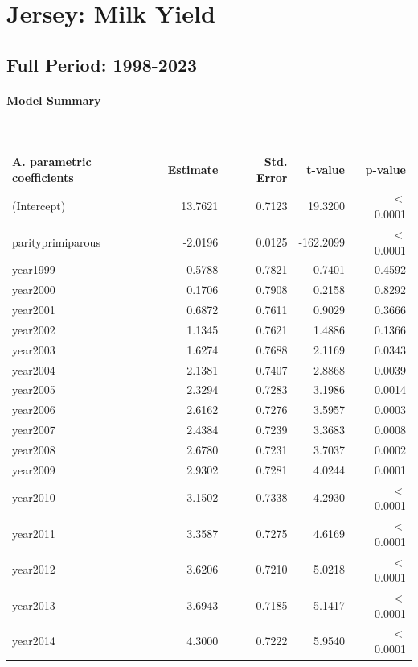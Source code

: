 \section{Jersey: Milk Yield}
\subsection{Full Period: 1998-2023}\label{model:je_milk_full}
\paragraph{Model Summary} \quad \\

    \begin{table}[H]
    \centering
    \begin{tabular}{lrrrr}
    \textbf{A. parametric coefficients} & Estimate & Std. Error & t-value & p-value \\ 
       \hline
       \hline
  (Intercept) & 13.7621 & 0.7123 & 19.3200 & $<$ 0.0001 \\ 
  parityprimiparous & -2.0196 & 0.0125 & -162.2099 & $<$ 0.0001 \\ 
  year1999 & -0.5788 & 0.7821 & -0.7401 & 0.4592 \\ 
  year2000 & 0.1706 & 0.7908 & 0.2158 & 0.8292 \\ 
  year2001 & 0.6872 & 0.7611 & 0.9029 & 0.3666 \\ 
  year2002 & 1.1345 & 0.7621 & 1.4886 & 0.1366 \\ 
  year2003 & 1.6274 & 0.7688 & 2.1169 & 0.0343 \\ 
  year2004 & 2.1381 & 0.7407 & 2.8868 & 0.0039 \\ 
  year2005 & 2.3294 & 0.7283 & 3.1986 & 0.0014 \\ 
  year2006 & 2.6162 & 0.7276 & 3.5957 & 0.0003 \\ 
  year2007 & 2.4384 & 0.7239 & 3.3683 & 0.0008 \\ 
  year2008 & 2.6780 & 0.7231 & 3.7037 & 0.0002 \\ 
  year2009 & 2.9302 & 0.7281 & 4.0244 & 0.0001 \\ 
  year2010 & 3.1502 & 0.7338 & 4.2930 & $<$ 0.0001 \\ 
  year2011 & 3.3587 & 0.7275 & 4.6169 & $<$ 0.0001 \\ 
  year2012 & 3.6206 & 0.7210 & 5.0218 & $<$ 0.0001 \\ 
  year2013 & 3.6943 & 0.7185 & 5.1417 & $<$ 0.0001 \\ 
  year2014 & 4.3000 & 0.7222 & 5.9540 & $<$ 0.0001 \\ 

\end{tabular}
\end{table}
